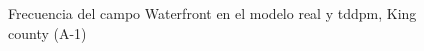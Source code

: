 \begin{figure}[H]
    \centering
    
    \caption{Frecuencia del campo Waterfront en el modelo real y tddpm, King county (A-1)}
    \label{frecuency-tddpm-waterfront}
\end{figure}